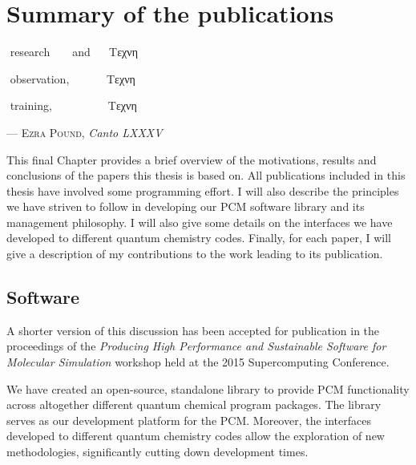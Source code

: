 \chapter{Summary of the publications}\label{ch:publications-summary}

\epigraph{\textonehalf\,\,research\,\,\,\,\,\,\,\,\,\,\,\,and \textonehalf\,\,\,\,\,\,\,\,Tεχνη

          \textonehalf\,\,observation,\,\,\,\,\,\,\,\,\,\,\,\,\textonehalf\,\,\,\,\,\,\,\,Tεχνη

          \textonehalf\,\,training,\,\,\,\,\,\,\,\,\,\,\,\,\,\,\,\,\,\,\,\,\,\,\textonehalf\,\,\,\,\,\,\,\,Tεχνη}{
  --- \textsc{Ezra Pound}, \textit{Canto LXXXV}}

This final Chapter provides a brief overview of the motivations, results and
conclusions of the papers this thesis is based on.
All publications included in this thesis have involved some programming effort.
I will also describe the principles we have striven to follow in developing our
\acs{PCM} software library and its management philosophy.
I will also give some details on the interfaces we have developed to different
quantum chemistry codes.
Finally, for each paper, I will give a description of my contributions to the
work leading to its publication.

\pagebreak

\section*{Software}


A shorter version of this discussion has been accepted for publication in the
proceedings of the \emph{Producing High Performance and Sustainable Software
for Molecular Simulation} workshop held at the 2015 Supercomputing Conference.

We have created an open-source, standalone library to provide \acs{PCM} functionality across
altogether different quantum chemical program packages.
The library serves as our development platform for the \acs{PCM}.
Moreover, the interfaces developed to different quantum chemistry codes allow the exploration
of new methodologies, significantly cutting down development times.

